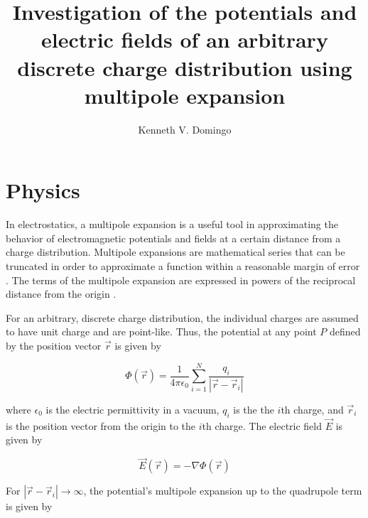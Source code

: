\documentclass[10pt,a4paper,twoside]{article}
\begin{document}
\title{\TitleFont Investigation of the potentials and electric fields of an arbitrary discrete charge distribution using multipole expansion}

\author[ ]{Kenneth V. Domingo\lastauthorsep}


\maketitle
\thispagestyle{titlestyle}

\section{Physics}
\label{sec:Intro}
\medskip
In electrostatics, a multipole expansion is a useful tool in approximating the behavior of electromagnetic potentials and fields at a certain distance from a charge distribution. Multipole expansions are mathematical series that can be truncated in order to approximate a function within a reasonable margin of error \cite{kinzel}. The terms of the multipole expansion are expressed in powers of the reciprocal distance from the origin \cite{griffiths}. 

For an arbitrary, discrete charge distribution, the individual charges are assumed to have unit charge and are point-like. Thus, the potential at any point $P$ defined by the position vector $\vec{r}$ is given by

\begin{equation}\label{eq:potential}
	\Phi(\vec{r}) = \frac{1}{4\pi\epsilon_0} \sum_{i=1}^N \frac{q_i}{|\vec{r} - \vec{r}_i|}
\end{equation}

where $\epsilon_0$ is the electric permittivity in a vacuum, $q_i$ is the the $i$th charge, and $\vec{r}_i$ is the position vector from the origin to the $i$th charge. The electric field $\vec{E}$ is given by

\begin{equation}\label{eq:efield}
	\vec{E}(\vec{r}) =  -\nabla \Phi(\vec{r})
\end{equation}

For $|\vec{r} - \vec{r}_i| \rightarrow \infty$, the potential's multipole expansion up to the quadrupole term is given by \cite{gradshteyn}
\end{document}

